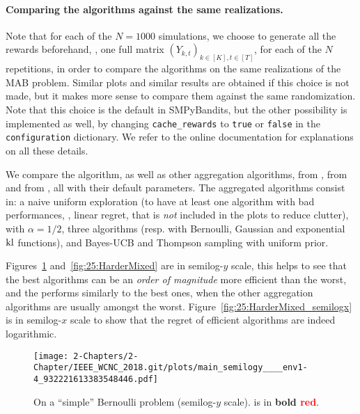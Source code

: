 \paragraph{Comparing the algorithms against the same realizations.}
%
Note that for each of the $N=1000$ simulations, we choose to generate all the rewards beforehand, \ie, one full matrix $(Y_{k,t})_{k\in[K], t\in[T]}$, for each of the $N$ repetitions, in order to compare the algorithms on the same realizations of the MAB problem.
%
Similar plots and similar results are obtained if this choice is not made, but it makes more sense to compare them against the same randomization. Note that this choice is the default in SMPyBandits, but the other possibility is implemented as well, by changing \texttt{cache\_rewards} to \texttt{true} or \texttt{false} in the \texttt{configuration} dictionary.
We refer to the online documentation for explanations on all these details.

We compare the \Aggr{} algorithm,
as well as other aggregation algorithms, \ExpQ{} from \cite{Bubeck12},
\CORRAL{} from \cite{Agarwal16} and \LearnExp{} from \cite{Singla17}, all with their default parameters.
%
The aggregated algorithms consist in:
a naive uniform exploration (to have at least one algorithm with bad performances, \ie, linear regret, that is \emph{not} included in the plots to reduce clutter),
\UCB{} with $\alpha=1/2$, three \klUCB{} algorithms (resp. with Bernoulli, Gaussian and exponential $\mathrm{kl}$ functions), and Bayes-UCB and Thompson sampling with uniform prior.

Figures~\ref{fig:25:EasyBernoulli} and~\ref{fig:25:HarderMixed} are in semilog-$y$ scale, this helps to see that the best algorithms can be an \emph{order of magnitude} more efficient than the worst, and the \Aggr{} performs similarly to the best ones, when the other aggregation algorithms are usually amongst the worst.
Figure~\ref{fig:25:HarderMixed_semilogx} is in semilog-$x$ scale to show that the regret of efficient algorithms are indeed logarithmic.


\begin{figure}[h!]  %
	\centering
	\texttt{[image: 2-Chapters/2-Chapter/IEEE\_WCNC\_2018.git/plots/main\_semilogy\_\_\_\_env1-4\_932221613383548446.pdf]}
	\caption{On a ``simple'' Bernoulli problem (semilog-$y$ scale). \Aggr{} is in \textbf{bold \textcolor{red}{red}}.}
	\label{fig:25:EasyBernoulli}
\end{figure}

